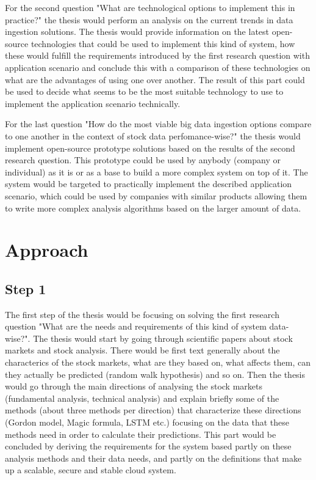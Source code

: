 \documentclass[article,11pt]{article}
\begin{document}
For the second question "What are technological options to implement this in practice?" the thesis would perform an analysis on the current trends in data ingestion solutions.
The thesis would provide information on the latest open-source technologies that could be used to implement this kind of system, how these would fulfill the requirements introduced by the first research question with application scenario and conclude this with a comparison of these technologies on what are the advantages of using one over another.
The result of this part could be used to decide what seems to be the most suitable technology to use to implement the application scenario technically. 

For the last question "How do the most viable big data ingestion options compare to one another in the context of stock data perfomance-wise?" the thesis would implement open-source prototype solutions based on the results of the second research question.
This prototype could be used by anybody (company or individual) as it is or as a base to build a more complex system on top of it.
The system would be targeted to practically implement the described application scenario, which could be used by companies with similar products allowing them to write more complex analysis algorithms based on the larger amount of data.

\section{Approach}

\subsection*{Step 1}

The first step of the thesis would be focusing on solving the first research question "What are the needs and requirements of this kind of system data-wise?".
The thesis would start by going through scientific papers about stock markets and stock analysis.
There would be first text generally about the characterics of the stock markets, what are they based on, what affects them, can they actually be predicted (random walk hypothesis) and so on.
Then the thesis would go through the main directions of analysing the stock markets (fundamental analysis, technical analysis) and explain briefly some of the methods (about three methods per direction) that characterize these directions (Gordon model, Magic formula, LSTM etc.) focusing on the data that these methods need in order to calculate their predictions.
This part would be concluded by deriving the requirements for the system based partly on these analysis methods and their data needs, and partly on the definitions that make up a scalable, secure and stable cloud system.
\end{document}
